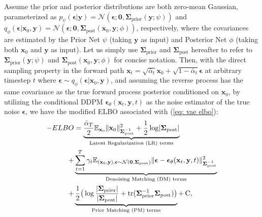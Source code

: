 \vspace{0.2cm}

\begin{proposition}[RestoreGrad]
    Assume the prior and posterior distributions are both zero-mean Gaussian, parameterized as $p_{\psi}(\boldsymbol{\epsilon}|\mathbf{y})=\mathcal{N}(\boldsymbol{\epsilon};\mathbf{0},\boldsymbol{\Sigma}_{\text{prior}}(\mathbf{y};\psi))$ and $q_{\phi}(\boldsymbol{\epsilon}|\mathbf{x}_0, \mathbf{y})=\mathcal{N}(\boldsymbol{\epsilon};\mathbf{0},\boldsymbol{\Sigma}_{\text{post}}(\mathbf{x}_0,\mathbf{y};\phi))$, respectively, where the covariances are estimated by the Prior Net $\psi$ (taking $\mathbf{y}$ as input) and Posterior Net $\phi$ (taking both $\mathbf{x}_0$ and $\mathbf{y}$ as input). Let us simply use $\boldsymbol{\Sigma}_{\text{prior}}$ and $\boldsymbol{\Sigma}_{\text{post}}$ hereafter to refer to $\boldsymbol{\Sigma}_{\text{prior}}(\mathbf{y};\psi)$ and $\boldsymbol{\Sigma}_{\text{post}}(\mathbf{x}_0,\mathbf{y};\phi)$ for concise notation. 
    Then, with the direct sampling property in the forward path $\mathbf{x}_t=\sqrt{\bar{\alpha}_t}\mathbf{x}_0+\sqrt{1-\bar{\alpha}_t}\boldsymbol{\epsilon}$ at arbitrary timestep $t$ where $\boldsymbol{\epsilon}\sim q_{\phi}(\boldsymbol{\epsilon}|\mathbf{x}_0,\mathbf{y})$, and assuming the reverse process has the same covariance as the true forward process posterior conditioned on $\mathbf{x}_0$, by utilizing the conditional DDPM $\boldsymbol{\epsilon}_\theta(\mathbf{x}_t,\mathbf{y},t)$ as the noise estimator of the true noise $\boldsymbol{\epsilon}$, we have the modified ELBO associated with (\ref{eq: vae elbo}): 
    \begin{equation}
    \begin{aligned}
        -ELBO & = \underbrace{\frac{\bar{\alpha}_T}{2}\mathbb{E}_{\mathbf{x}_0}\norm{\mathbf{x}_0}^2_{\boldsymbol{\Sigma}^{-1}_{\text{post}}}+\frac{1}{2}\log\abs{\boldsymbol{\Sigma}_{\text{post}}}}_{\text{Latent Regularization (LR) terms}} \\
        +&\underbrace{\sum_{t=1}^{T}\gamma_t\mathbb{E}_{(\mathbf{x}_0,\mathbf{y}),\boldsymbol{\epsilon}\sim \mathcal{N}(\mathbf{0},\boldsymbol{\Sigma}_{\text{post}})}\norm{\boldsymbol{\epsilon}-\boldsymbol{\epsilon}_\theta(\mathbf{x}_t,\mathbf{y},t)}^2_{\boldsymbol{\Sigma}^{-1}_{\text{post}}}}_{\text{Denoising Matching (DM) terms}} \\
        +&\underbrace{\frac{1}{2}\bigr(\log\frac{\abs{\boldsymbol{\Sigma}_{\text{prior}}}}{\abs{\boldsymbol{\Sigma}_{\text{post}}}}+\text{tr}(\boldsymbol{\Sigma}_{\text{prior}}^{-1}\boldsymbol{\Sigma}_{\text{post}})\bigr)}_{\text{Prior Matching (PM) terms}} + \, \text{C},

\end{aligned}
\end{equation}
\end{proposition}
